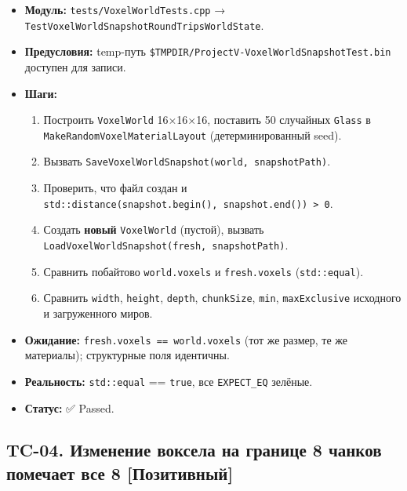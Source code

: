 \documentclass[
  11pt,a4paper,oneside]{article}
\providecommand{\tightlist}{%
  \setlength{\itemsep}{0pt}\setlength{\parskip}{0pt}}
\providecommand{\tightlist}{%
  \setlength{\itemsep}{0pt}\setlength{\parskip}{0pt}}
\begin{document}
\begin{itemize}
\tightlist
\item
  \textbf{Модуль:} \texttt{tests/VoxelWorldTests.cpp} → \texttt{TestVoxelWorldSnapshotRoundTripsWorldState}.
\item
  \textbf{Предусловия:} temp-путь \texttt{\$TMPDIR/ProjectV-VoxelWorldSnapshotTest.bin} доступен для записи.
\item
  \textbf{Шаги:}

  \begin{enumerate}
  \def\labelenumi{\arabic{enumi}.}
  \tightlist
  \item
    Построить \texttt{VoxelWorld} 16×16×16, поставить 50 случайных \texttt{Glass} в \texttt{MakeRandomVoxelMaterialLayout} (детерминированный seed).
  \item
    Вызвать \texttt{SaveVoxelWorldSnapshot(world,\ snapshotPath)}.
  \item
    Проверить, что файл создан и \texttt{std::distance(snapshot.begin(),\ snapshot.end())\ \textgreater{}\ 0}.
  \item
    Создать \textbf{новый} \texttt{VoxelWorld} (пустой), вызвать \texttt{LoadVoxelWorldSnapshot(fresh,\ snapshotPath)}.
  \item
    Сравнить побайтово \texttt{world.voxels} и \texttt{fresh.voxels} (\texttt{std::equal}).
  \item
    Сравнить \texttt{width}, \texttt{height}, \texttt{depth}, \texttt{chunkSize}, \texttt{min}, \texttt{maxExclusive} исходного и загруженного миров.
  \end{enumerate}
\item
  \textbf{Ожидание:} \texttt{fresh.voxels\ ==\ world.voxels} (тот же размер, те же материалы); структурные поля идентичны.
\item
  \textbf{Реальность:} \texttt{std::equal} == \texttt{true}, все \texttt{EXPECT\_EQ} зелёные.
\item
  \textbf{Статус:} ✅ Passed.
\end{itemize}

\subsection{TC-04. Изменение воксела на границе 8 чанков помечает все 8 {[}Позитивный{]}}\label{tc-04-ux438ux437ux43cux435ux43dux435ux43dux438ux435-ux432ux43eux43aux441ux435ux43bux430-ux43dux430-ux433ux440ux430ux43dux438ux446ux435-8-ux447ux430ux43dux43aux43eux432-ux43fux43eux43cux435ux447ux430ux435ux442-ux432ux441ux435-8-ux43fux43eux437ux438ux442ux438ux432ux43dux44bux439}
\end{document}
